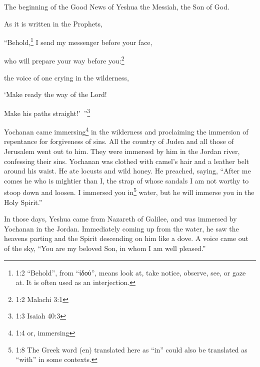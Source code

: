 \newpage
\null
\thispagestyle{empty}
\newpage
{}





\vspace{-1.36in}

\mychapter{} \myverse*{}The beginning of the Good News of Yeshua the Messiah, the Son of
God.

\myverse{}As it is written in the Prophets,

“Behold,\footnote{1:2 “Behold”, from “ἰδοὺ”, means look at, take notice, observe, see, or gaze at. It is often used
	as an interjection.} I send my messenger before your face,

who will prepare your way before you:\footnote{1:2 Malachi 3:1}

\myverse{}the voice of one crying in the wilderness,

‘Make ready the way of the Lord!

Make his paths straight!’ ”\footnote{1:3 Isaiah 40:3}

\myverse{}Yochanan came immersing\footnote{1:4 or, immersing} in the wilderness and proclaiming the immersion of repentance for forgiveness
of sins.
\myverse{}All the country of Judea and all those of Jerusalem went out to him. They were
immersed by him in the Jordan river, confessing their sins.
\myverse{}Yochanan was clothed with camel’s hair and a leather belt around his waist.
He ate locusts and wild honey.
\myverse{}He preached, saying, “After me comes he who is mightier than I, the strap of
whose sandals I am not worthy to stoop down and loosen.
\myverse{}I immersed you in\footnote{1:8 The Greek word (en) translated here as “in” could also be translated as “with” in some contexts.}
water, but he will immerse you in the Holy Spirit.”

\myverse{}In those days, Yeshua came from Nazareth of Galilee, and was immersed
by Yochanan in the Jordan.
\myverse{}Immediately coming up from the water, he saw the heavens parting and the Spirit
descending on him like a dove.
\myverse{}A voice came out of the sky, “You are my beloved Son, in whom I am well pleased.”

